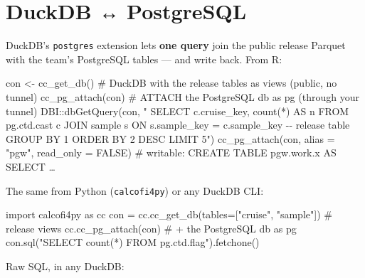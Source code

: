 \documentclass[
  letterpaper,
  DIV=11,
  numbers=noendperiod]{scrreprt}
\newenvironment{Shaded}{\begin{snugshade}}{\end{snugshade}}
\newcommand{\AttributeTok}[1]{\textcolor[rgb]{0.40,0.45,0.13}{#1}}
\newcommand{\CommentTok}[1]{\textcolor[rgb]{0.37,0.37,0.37}{#1}}
\newcommand{\ConstantTok}[1]{\textcolor[rgb]{0.56,0.35,0.01}{#1}}
\newcommand{\FunctionTok}[1]{\textcolor[rgb]{0.28,0.35,0.67}{#1}}
\newcommand{\ImportTok}[1]{\textcolor[rgb]{0.00,0.46,0.62}{#1}}
\newcommand{\NormalTok}[1]{\textcolor[rgb]{0.00,0.23,0.31}{#1}}
\newcommand{\OperatorTok}[1]{\textcolor[rgb]{0.37,0.37,0.37}{#1}}
\newcommand{\OtherTok}[1]{\textcolor[rgb]{0.00,0.23,0.31}{#1}}
\newcommand{\SpecialCharTok}[1]{\textcolor[rgb]{0.37,0.37,0.37}{#1}}
\newcommand{\StringTok}[1]{\textcolor[rgb]{0.13,0.47,0.30}{#1}}
\begin{document}
\section{DuckDB ↔ PostgreSQL}\label{sec-duckdb-pg}

DuckDB's \texttt{postgres} extension lets \textbf{one query} join the
public release Parquet with the team's PostgreSQL tables --- and write
back. From R:

\begin{Shaded}
\begin{Highlighting}[]
\NormalTok{con }\OtherTok{\textless{}{-}} \FunctionTok{cc\_get\_db}\NormalTok{()                 }\CommentTok{\# DuckDB with the release tables as views (public, no tunnel)}
\FunctionTok{cc\_pg\_attach}\NormalTok{(con)                  }\CommentTok{\# ATTACH the PostgreSQL db as \textasciigrave{}pg\textasciigrave{} (through your tunnel)}
\NormalTok{DBI}\SpecialCharTok{::}\FunctionTok{dbGetQuery}\NormalTok{(con, }\StringTok{"}
\StringTok{  SELECT c.cruise\_key, count(*) AS n}
\StringTok{  FROM pg.ctd.cast c}
\StringTok{  JOIN sample s ON s.sample\_key = c.sample\_key      {-}{-} release table}
\StringTok{  GROUP BY 1 ORDER BY 2 DESC LIMIT 5"}\NormalTok{)}
\FunctionTok{cc\_pg\_attach}\NormalTok{(con, }\AttributeTok{alias =} \StringTok{"pgw"}\NormalTok{, }\AttributeTok{read\_only =} \ConstantTok{FALSE}\NormalTok{) }\CommentTok{\# writable: CREATE TABLE pgw.work.x AS SELECT …}
\end{Highlighting}
\end{Shaded}

The same from Python (\texttt{calcofi4py}) or any DuckDB CLI:

\begin{Shaded}
\begin{Highlighting}[]
\ImportTok{import}\NormalTok{ calcofi4py }\ImportTok{as}\NormalTok{ cc}
\NormalTok{con }\OperatorTok{=}\NormalTok{ cc.cc\_get\_db(tables}\OperatorTok{=}\NormalTok{[}\StringTok{"cruise"}\NormalTok{, }\StringTok{"sample"}\NormalTok{])   }\CommentTok{\# release views}
\NormalTok{cc.cc\_pg\_attach(con)                               }\CommentTok{\# + the PostgreSQL db as \textasciigrave{}pg\textasciigrave{}}
\NormalTok{con.sql(}\StringTok{"SELECT count(*) FROM pg.ctd.flag"}\NormalTok{).fetchone()}
\end{Highlighting}
\end{Shaded}

Raw SQL, in any DuckDB:
\end{document}
